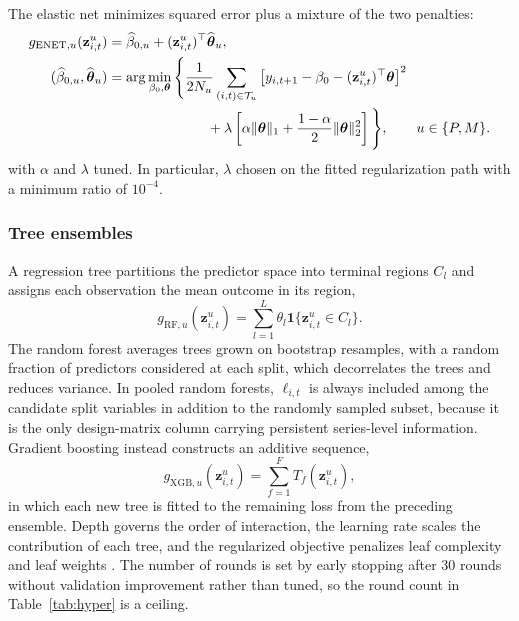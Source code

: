 \documentclass[preprint,12pt,authoryear]{elsarticle}
\begin{document}
\begin{appendices}
 The elastic net minimizes squared error plus a mixture of the two penalties:
\begin{equation}
	\begin{aligned}
		g_{\mathrm{ENET},u}(\mathbf{z}^{u}_{i,t})
		&=
		\widehat{\beta}_{0,u}
		+
		(\mathbf{z}^{u}_{i,t})^{\top}
		\widehat{\boldsymbol{\theta}}_{u},\\
		(\widehat{\beta}_{0,u},\widehat{\boldsymbol{\theta}}_{u})
		&=
		\arg\min_{\beta_0,\boldsymbol{\theta}}
		\Bigg\{
		\frac{1}{2N_u}
		\sum_{(i,t)\in\mathcal{T}_u}
		\left[
		y_{i,t+1}-\beta_0
		-(\mathbf{z}^{u}_{i,t})^{\top}\boldsymbol{\theta}
		\right]^2\\
		&\hspace{2.5cm}
		+
		\lambda
		\left[
		\alpha\lVert\boldsymbol{\theta}\rVert_1
		+
		\frac{1-\alpha}{2}
		\lVert\boldsymbol{\theta}\rVert_2^2
		\right]
		\Bigg\},
		\qquad u\in\{P,M\}.
	\end{aligned}
\end{equation}
with $\alpha$ and $\lambda$ tuned. In particular, $\lambda$ chosen on the fitted regularization path with a minimum ratio of $10^{-4}$.

\subsubsection{Tree ensembles}

A regression tree partitions the predictor space into terminal regions $C_l$ and assigns each observation the mean outcome in its region, \begin{equation}
g_{\mathrm{RF},u}(\mathbf{z}^{u}_{i,t}) = \sum_{l=1}^{L} \theta_l
 \mathbf{1}\{\mathbf{z}^{u}_{i,t} \in C_l\}.
\end{equation}
The random forest averages trees grown on bootstrap resamples, with a random
fraction of predictors considered at each split, which decorrelates the trees
and reduces variance. In pooled random forests, $\ell_{i,t}$ is always included
among the candidate split variables in addition to the randomly sampled subset,
because it is the only design-matrix column carrying persistent series-level
information. Gradient boosting instead constructs an additive sequence,
\begin{equation}
g_{\mathrm{XGB},u}(\mathbf{z}^{u}_{i,t}) = \sum_{f=1}^{F} T_f(\mathbf{z}^{u}_{i,t}),
\end{equation}
in which each new tree is fitted to the remaining loss from the preceding ensemble. Depth governs the order of interaction, the learning rate scales the contribution of each tree, and the regularized objective penalizes leaf
complexity and leaf weights \citep{chenguestrin2016}. The number of rounds is set by early stopping after 30 rounds without validation improvement rather than tuned, so the round count in Table~\ref{tab:hyper} is a ceiling.


\end{appendices}
\end{document}
